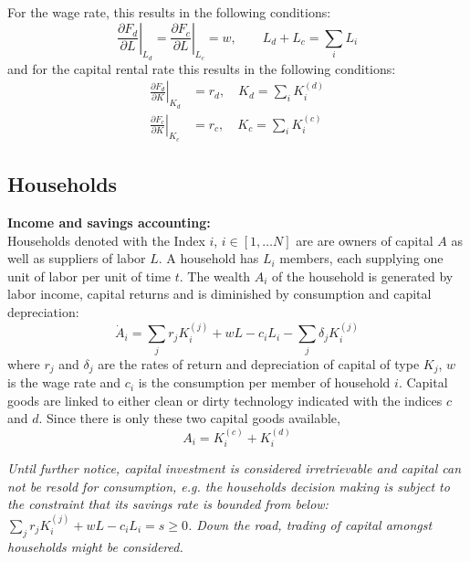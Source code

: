 For the wage rate, this results in the following conditions:
\begin{equation}
	\left. \frac{\partial F_d}{ \partial L} \right|_{L_d} = \left. \frac{\partial F_c}{\partial L}\right|_{L_c} = w, \qquad L_d + L_c = \sum_i L_i
	\label{eq:wage_rage}
\end{equation}
and for the capital rental rate this results in the following conditions:
\begin{align}
	\left. \frac{\partial F_d}{\partial K}\right|_{K_d} &= r_d,\quad K_d = \sum_i K^{(d)}_i \nonumber \\
	\left. \frac{\partial F_c}{\partial K}\right|_{K_c} &= r_c,\quad K_c = \sum_i K^{(c)}_i 
	\label{eq:capital_rental_rate}
\end{align}


\subsection{Households}

\textbf{Income and savings accounting:} \\
Households denoted with the Index $i$, $i \in [1, \dots N]$ are are owners of capital $A$ as well as suppliers of labor $L$. A household has $L_i$ members, each supplying one unit of labor per unit of time $t$. The wealth $A_i$ of the household is generated by labor income, capital returns and is diminished by consumption and capital depreciation:
\begin{equation}
	\dot{A}_i = \sum_j r_j K^{(j)}_{i} + wL -c_{i}L_i - \sum_j \delta_j K^{(j)}_{i}
	\label{eq:household_wealth}
\end{equation}
where $r_j$ and $\delta_j$ are the rates of return and depreciation of capital of type $K_j$, $w$ is the wage rate and $c_i$ is the consumption per member of household $i$. Capital goods are linked to either clean or dirty technology indicated with the indices $c$ and $d$. Since there is only these two capital goods available,
\begin{equation}
	A_i = K^{(c)}_{i} + K^{(d)}_{i}
	\label{eq:household_capital}
\end{equation}

\textit{ Until further notice, capital investment is considered irretrievable and capital can not be resold for consumption, e.g. the households decision making is subject to the constraint that its savings rate is bounded from below: $\sum_j r_j K^{(j)}_{i} + wL -c_{i}L_i = s \ge 0$. Down the road, trading of capital amongst households might be considered.} \\


